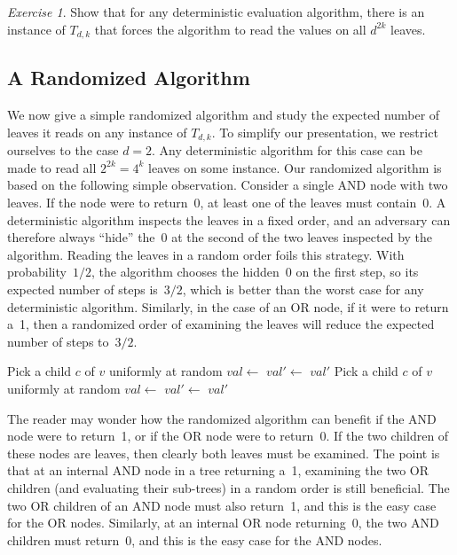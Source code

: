 \documentclass[twoside,12pt]{book}
\theoremstyle{plain}
\theoremstyle{definition}
\theoremstyle{remark}
\newtheorem{exercise}[theorem]{Exercise}
\begin{document}
\begin{exercise}
Show that for any deterministic evaluation algorithm, there is an instance of
$T_{d,k}$ that forces the algorithm to read the values on all $d^{2k}$ leaves.
\end{exercise}

\subsection{A Randomized Algorithm}

We now give a simple randomized algorithm and study the expected number of
leaves it reads on any instance of $T_{d,k}$.  To simplify our presentation,
we restrict ourselves to the case $d=2$.  Any deterministic algorithm for this
case can be made to read all $2^{2k}=4^k$ leaves on some instance.  Our
randomized algorithm is based on the following simple observation.  Consider
a single AND node with two leaves.  If the node were to return~0, at least
one of the leaves must contain~0.  A deterministic algorithm inspects the
leaves in a fixed order, and an adversary can therefore always ``hide'' the~0
at the second of the two leaves inspected by the algorithm.  Reading the
leaves in a random order foils this strategy.  With probability~$1/2$, the
algorithm chooses the hidden~0 on the first step, so its expected number of
steps is~$3/2$, which is better than the worst case for any deterministic
algorithm.  Similarly, in the case of an OR node, if it were to return a~1,
then a randomized order of examining the leaves will reduce the expected
number of steps to~$3/2$.

\begin{algorithm}[htbp]
\caption{Randomized evaluation of $T_{2,k}$}
\label{alg:gametree}
\begin{algorithmic}[1]
  \State Pick a child $c$ of $v$ uniformly at random
  \State $val \gets$ 
    \State {}
  \EndIf
  \State $val' \gets$ 
  \State \Return $val'$
\EndProcedure
\Statex
{}
  \State Pick a child $c$ of $v$ uniformly at random
  \State $val \gets$ 
    \State {}
  \EndIf
  \State $val' \gets$ 
  \State \Return $val'$
\EndProcedure
\end{algorithmic}
\end{algorithm}

The reader may wonder how the randomized algorithm can benefit if the AND node
were to return~1, or if the OR node were to return~0.  If the two children of
these nodes are leaves, then clearly both leaves must be examined.  The point
is that at an internal AND node in a tree returning a~1, examining the two OR
children (and evaluating their sub-trees) in a random order is still
beneficial.  The two OR children of an AND node must also return~1, and this
is the easy case for the OR nodes.  Similarly, at an internal OR node
returning~0, the two AND children must return~0, and this is the easy case
for the AND nodes.
\end{document}
